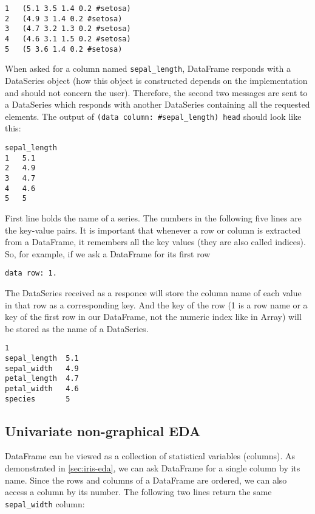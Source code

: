 \documentclass[sigplan]{acmart}
\begin{document}
\begin{lstlisting}[basicstyle=\small,language=Smalltalk]
1   (5.1 3.5 1.4 0.2 #setosa)
2   (4.9 3 1.4 0.2 #setosa)
3   (4.7 3.2 1.3 0.2 #setosa)
4   (4.6 3.1 1.5 0.2 #setosa)
5   (5 3.6 1.4 0.2 #setosa)
\end{lstlisting}

When asked for a column named \texttt{sepal\_length}, DataFrame responds with a DataSeries object (how this object is constructed depends on the implementation and should not concern the user). Therefore, the second two messages are sent to a DataSeries which responds with another DataSeries containing all the requested elements.
The output of \texttt{(data column: \#sepal\_length) head} should look like this:

\begin{lstlisting}[basicstyle=\small,language=Smalltalk]
sepal_length
1   5.1
2   4.9
3   4.7
4   4.6
5   5
\end{lstlisting}

First line holds the name of a series. The numbers in the following five lines are the key-value pairs. It is important that whenever a row or column is extracted from a DataFrame, it remembers all the key values (they are also called indices). So, for example, if we ask a DataFrame for its first row

\begin{lstlisting}[basicstyle=\small,language=Smalltalk]
data row: 1.
\end{lstlisting}

The DataSeries received as a responce will store the column name of each value in that row as a corresponding key. And the key of the row (1 is a row name or a key of the first row in our DataFrame, not the numeric index like in Array) will be stored as the name of a DataSeries.

\begin{lstlisting}[basicstyle=\small,language=Smalltalk]
1
sepal_length  5.1
sepal_width   4.9
petal_length  4.7 
petal_width   4.6
species       5 
\end{lstlisting}

\subsection{Univariate non-graphical EDA}
\label{sec:uni-non}

DataFrame can be viewed as a collection of statistical variables (columns). As demonstrated in \ref{sec:iris-eda}, we can ask DataFrame for a single column by its name. Since the rows and columns of a DataFrame are ordered, we can also access a column by its number. The following two lines return the same \texttt{sepal\_width} column:
\end{document}
